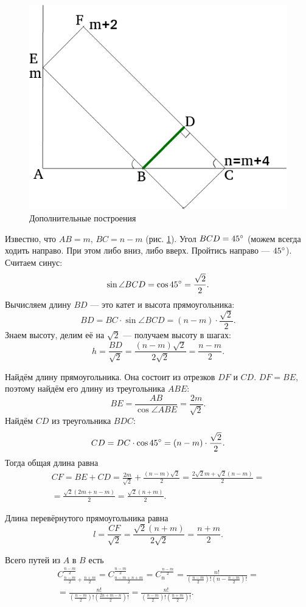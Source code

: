 \begin{enumerate}[label=\alph*)]
\begin{figure}[h!]
  \centering
  \includegraphics[width=.6\textwidth]{./pictures/4_22_8.png}
  \caption{Дополнительные построения}
  \label{fig:4228}
\end{figure}

Известно, что $AB = m, \, BC = n - m$ (рис. \ref{fig:4228}).
Угол $BCD = 45 \degree$ (можем всегда ходить направо.
При этом либо вниз, либо вверх.
Пройтись направо --- $45 \degree$).
Считаем синус:
$$ \sin \angle BCD =
\cos 45 \degree =
\frac{ \sqrt{2} }{2}.$$
Вычисляем длину $BD$ --- это катет и высота прямоугольника:
$$BD =
BC \cdot \sin \angle BCD =
\left( n-m \right) \cdot \frac{ \sqrt{2} }{2}.$$
Знаем высоту, делим её на $ \sqrt{2} $ --- получаем высоту в шагах:
$$h =
\frac{BD}{ \sqrt{2} } =
\frac{ \left( n-m \right) \sqrt{2} }{2 \sqrt{2} } =
\frac{n-m}{2}.$$

Найдём длину прямоугольника. Она состоит из отрезков $DF$ и $CD$.
$DF = BE$, поэтому найдём его длину из треугольника $ABE$:
$$BE =
\frac{AB}{ \cos \angle ABE} =
\frac{2m}{ \sqrt{2} }.$$
Найдём $CD$ из треугольника $BDC$:
$$CD =
DC \cdot \cos 45 \degree =
\left( n-m \right) \cdot \frac{ \sqrt{2} }{2}.$$
Тогда общая длина равна
\begin{equation*}
\begin{split}
CF =
BE + CD =
\frac{2m}{ \sqrt{2} } + \frac{ \left( n-m \right) \sqrt{2} }{2} =
\frac{2 \sqrt{2} m + \sqrt{2} \left( n-m \right) }{2} = \\
= \frac{ \sqrt{2} \left( 2m+n-m \right) }{2} =
\frac{ \sqrt{2} \left( n+m \right) }{2}.
\end{split}
\end{equation*}

Длина перевёрнутого прямоугольника равна
$$l =
\frac{CF}{ \sqrt{2} } =
\frac{ \sqrt{2} \left( n+m \right) }{2 \sqrt{2} } =
\frac{n+m}{2}.$$

Всего путей из $A$ в $B$ есть
\begin{equation*}
\begin{split}
C_{ \frac{n-m}{2} + \frac{n+m}{2} }^{ \frac{n-m}{2} } =
C_{ \frac{n-m+n+m}{2} }^{ \frac{n-m}{2} } =
C_n^{ \frac{n-m}{2} } =
\frac{n!}{ \left( \frac{n-m}{2} \right)! \left( n - \frac{n-m}{2} \right)! } = \\
= \frac{n!}{ \left( \frac{n-m}{2} \right)! \left( \frac{2n+m-n}{2} \right)!} =
\frac{n!}{ \left( \frac{n-m}{2} \right)! \left( \frac{n+m}{2} \right)!}. 
\end{split}
\end{equation*}


\end{enumerate}
